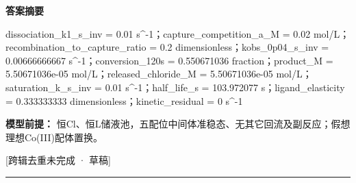 \documentclass[UTF8,11pt,a4paper]{ctexart}
\begin{document}
\noindent\textbf{答案摘要}\par
dissociation\_k1\_s\_inv = 0.01 s\textasciicircum{}-1；capture\_competition\_a\_M = 0.02 mol/L；recombination\_to\_capture\_ratio = 0.2 dimensionless；kobs\_0p04\_s\_inv = 0.00666666667 s\textasciicircum{}-1；conversion\_120s = 0.550671036 fraction；product\_M = 5.50671036e-05 mol/L；released\_chloride\_M = 5.50671036e-05 mol/L；saturation\_k\_s\_inv = 0.01 s\textasciicircum{}-1；half\_life\_s = 103.972077 s；ligand\_elasticity = 0.333333333 dimensionless；kinetic\_residual = 0 s\textasciicircum{}-1\par
\noindent\textbf{模型前提：}
恒Cl、恒L储液池，五配位中间体准稳态、无其它回流及副反应；假想理想Co(III)配体置换。\par
\noindent\textcolor{red!65!black}{[跨辑去重未完成 · 草稿]} \par
\medskip\hrule\medskip
{}
\end{document}
